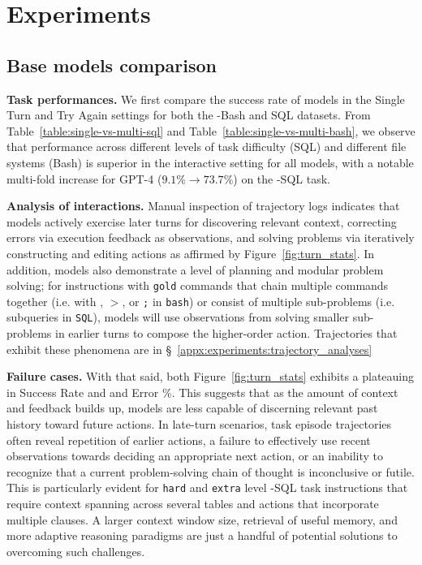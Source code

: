 \section{Experiments}
\label{sec:experiments}



\subsection{Base models comparison}
\label{sec:experiments:base_compare}
\textbf{Task performances.} We first compare the success rate of models in the Single Turn and Try Again settings for both the \benchmark{}-Bash and SQL datasets.
From Table~\ref{table:single-vs-multi-sql} and Table~\ref{table:single-vs-multi-bash}, we observe that performance across different levels of task difficulty (SQL) and different file systems (Bash) is superior in the interactive setting for all models, with a notable multi-fold increase for GPT-4 ($9.1\% \rightarrow 73.7\%$) on the \benchmark{}-SQL task.

\textbf{Analysis of interactions.} Manual inspection of trajectory logs indicates that models actively exercise later turns for discovering relevant context, correcting errors via execution feedback as observations, and solving problems via iteratively constructing and editing actions as affirmed by Figure~\ref{fig:turn_stats}.
In addition, models also demonstrate a level of planning and modular problem solving; for instructions with \texttt{gold} commands that chain multiple commands together (i.e. with \text{\textbar}, $>$, or \texttt{;} in \texttt{bash}) or consist of multiple sub-problems (i.e. subqueries in \texttt{SQL}), models will use observations from solving smaller sub-problems in earlier turns to compose the higher-order action. Trajectories that exhibit these phenomena are in \S~\ref{appx:experiments:trajectory_analyses}

\textbf{Failure cases.} With that said, both Figure~\ref{fig:turn_stats} exhibits a plateauing in Success Rate and and Error \%.
This suggests that as the amount of context and feedback builds up, models are less capable of discerning relevant past history toward future actions.
In late-turn scenarios, task episode trajectories often reveal repetition of earlier actions, a failure to effectively use recent observations towards deciding an appropriate next action, or an inability to recognize that a current problem-solving chain of thought is inconclusive or futile.
This is particularly evident for \texttt{hard} and \texttt{extra} level \benchmark{}-SQL task instructions that require context spanning across several tables and actions that incorporate multiple clauses.
A larger context window size, retrieval of useful memory, and more adaptive reasoning paradigms are just a handful of potential solutions to overcoming such challenges.

